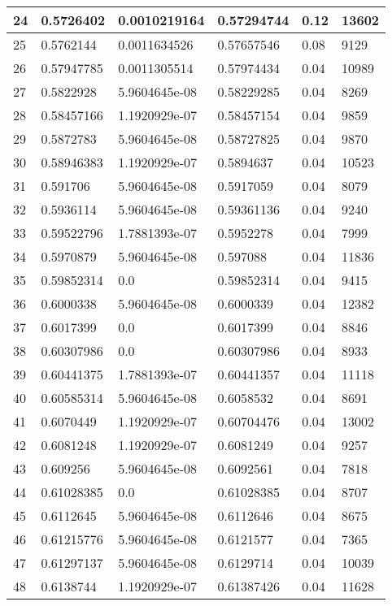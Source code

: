 \begin{longtable}{|l|l|l|l|l|l|}
24 & 0.5726402 & 0.0010219164 & 0.57294744 & 0.12 & 13602 \\ \hline 
25 & 0.5762144 & 0.0011634526 & 0.57657546 & 0.08 & 9129 \\ \hline 
26 & 0.57947785 & 0.0011305514 & 0.57974434 & 0.04 & 10989 \\ \hline 
27 & 0.5822928 & 5.9604645e-08 & 0.58229285 & 0.04 & 8269 \\ \hline 
28 & 0.58457166 & 1.1920929e-07 & 0.58457154 & 0.04 & 9859 \\ \hline 
29 & 0.5872783 & 5.9604645e-08 & 0.58727825 & 0.04 & 9870 \\ \hline 
30 & 0.58946383 & 1.1920929e-07 & 0.5894637 & 0.04 & 10523 \\ \hline 
31 & 0.591706 & 5.9604645e-08 & 0.5917059 & 0.04 & 8079 \\ \hline 
32 & 0.5936114 & 5.9604645e-08 & 0.59361136 & 0.04 & 9240 \\ \hline 
33 & 0.59522796 & 1.7881393e-07 & 0.5952278 & 0.04 & 7999 \\ \hline 
34 & 0.5970879 & 5.9604645e-08 & 0.597088 & 0.04 & 11836 \\ \hline 
35 & 0.59852314 & 0.0 & 0.59852314 & 0.04 & 9415 \\ \hline 
36 & 0.6000338 & 5.9604645e-08 & 0.6000339 & 0.04 & 12382 \\ \hline 
37 & 0.6017399 & 0.0 & 0.6017399 & 0.04 & 8846 \\ \hline 
38 & 0.60307986 & 0.0 & 0.60307986 & 0.04 & 8933 \\ \hline 
39 & 0.60441375 & 1.7881393e-07 & 0.60441357 & 0.04 & 11118 \\ \hline 
40 & 0.60585314 & 5.9604645e-08 & 0.6058532 & 0.04 & 8691 \\ \hline 
41 & 0.6070449 & 1.1920929e-07 & 0.60704476 & 0.04 & 13002 \\ \hline 
42 & 0.6081248 & 1.1920929e-07 & 0.6081249 & 0.04 & 9257 \\ \hline 
43 & 0.609256 & 5.9604645e-08 & 0.6092561 & 0.04 & 7818 \\ \hline 
44 & 0.61028385 & 0.0 & 0.61028385 & 0.04 & 8707 \\ \hline 
45 & 0.6112645 & 5.9604645e-08 & 0.6112646 & 0.04 & 8675 \\ \hline 
46 & 0.61215776 & 5.9604645e-08 & 0.6121577 & 0.04 & 7365 \\ \hline 
47 & 0.61297137 & 5.9604645e-08 & 0.6129714 & 0.04 & 10039 \\ \hline 
48 & 0.6138744 & 1.1920929e-07 & 0.61387426 & 0.04 & 11628 \\ \hline 

\end{longtable}
